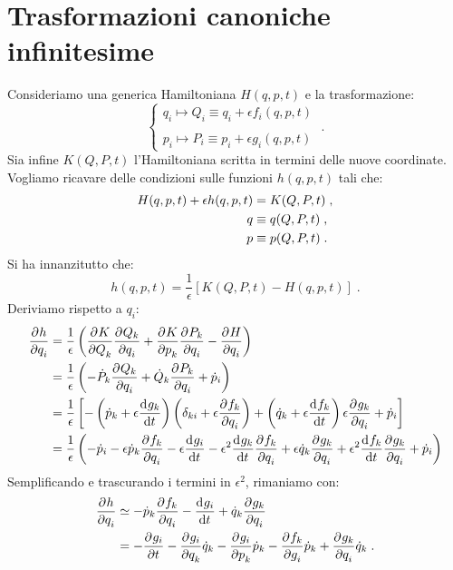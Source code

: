 \section{Trasformazioni canoniche infinitesime}
Consideriamo una generica Hamiltoniana $H(q,p,t)$ e la trasformazione:
\begin{equation}
\begin{cases}
q_i\longmapsto Q_i\equiv q_i+\epsilon f_i(q,p,t) \\
\\
p_i \longmapsto P_i\equiv p_i+\epsilon g_i(q,p,t)
\end{cases}\;.
\end{equation}
Sia infine $K(Q,P,t)$ l'Hamiltoniana scritta in termini delle nuove coordinate. Vogliamo ricavare delle condizioni sulle funzioni $h(q,p,t)$ tali che:
\begin{align}
H(q,p,t)+\epsilon h(q,p,t) &= K(Q,P,t)\;, \notag \\
q &\equiv q(Q,P,t)\;, \notag \\
p &\equiv p(Q,P,t)\;.
\end{align}
Si ha innanzitutto che:
\begin{equation}
h(q,p,t)=\frac{1}{\epsilon}[K(Q,P,t)-H(q,p,t)]\;.
\end{equation}
Deriviamo rispetto a $q_i$:
\begin{align}
\frac{\partial^{}h}{\partial q_i^{}} &= \frac{1}{\epsilon}\left(\frac{\partial^{}K}{\partial Q_k^{}}\frac{\partial^{}Q_k}{\partial q_i^{}}+\frac{\partial^{}K}{\partial p_k^{}}\frac{\partial^{}P_k}{\partial q_i^{}}-\frac{\partial^{}H}{\partial q_i^{}}\right) \notag \\
&= \frac{1}{\epsilon}\left(-\dot{P}_k\frac{\partial^{}Q_k}{\partial q_i^{}}+\dot{Q}_k\frac{\partial^{}P_k}{\partial q_i^{}}+\dot{p}_i\right) \notag \\
&=\frac{1}{\epsilon}\left[-\left(\dot{p}_k+\epsilon\frac{\mathrm{d}^{}g_k}{\mathrm{d}t^{}}\right)\left(\delta_{ki}+\epsilon\frac{\partial^{}f_k}{\partial q_i^{}}\right)+\left(\dot{q}_k+\epsilon\frac{\mathrm{d}^{}f_k}{\mathrm{d}t^{}}\right)\epsilon\frac{\partial^{}g_k}{\partial q_i^{}}+\dot{p}_i\right] \notag \\
&= \frac{1}{\epsilon}\left(-\dot{p}_i-\epsilon\dot{p}_k\frac{\partial^{}f_k}{\partial q_i^{}}-\epsilon\frac{\mathrm{d}^{}g_i}{\mathrm{d}t^{}}-\epsilon^2\frac{\mathrm{d}^{}g_k}{\mathrm{d}t^{}}\frac{\partial^{}f_k}{\partial q_i^{}}+\epsilon\dot{q}_k\frac{\partial^{}g_k}{\partial q_i^{}}+\epsilon^2\frac{\mathrm{d}^{}f_k}{\mathrm{d}t^{}}\frac{\partial^{}g_k}{\partial q_i^{}}+\dot{p}_i\right)
\end{align}
Semplificando e trascurando i termini in $\epsilon^2$, rimaniamo con:
\begin{align}
\frac{\partial^{}h}{\partial q_i^{}}&\simeq -\dot{p}_k\frac{\partial^{}f_k}{\partial q_i^{}}-\frac{\mathrm{d}^{}g_i}{\mathrm{d}t^{}}+\dot{q}_k\frac{\partial^{}g_k}{\partial q_i^{}} \notag \\
&=-\frac{\partial^{}g_i}{\partial t^{}}-\frac{\partial^{}g_i}{\partial q_k^{}}\dot{q}_k-\frac{\partial^{}g_i}{\partial p_k^{}}\dot{p}_k-\frac{\partial^{}f_k}{\partial g_i^{}}\dot{p}_k+\frac{\partial^{}g_k}{\partial q_i^{}}\dot{q}_k\;.
\end{align}

